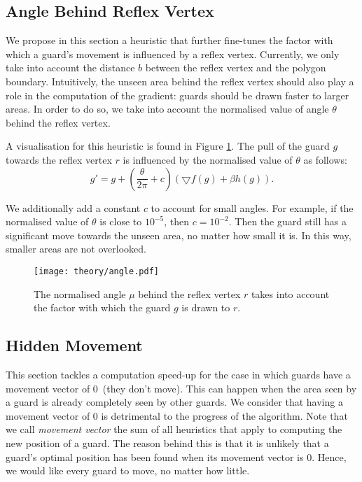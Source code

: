 \subsection{Angle Behind Reflex Vertex}
\label{sec:angle}
We propose in this section a heuristic that further fine-tunes the factor with which a guard's movement is influenced by a reflex vertex. Currently, we only take into account the distance $b$ between the reflex vertex and the polygon boundary. Intuitively, the unseen area behind the reflex vertex should also play a role in the computation of the gradient: guards should be drawn faster to larger areas. In order to do so, we  take into account the normalised value of angle $\theta$ behind the reflex vertex.

A visualisation for this heuristic is found in Figure \ref{fig:angle}. The pull of the guard $g$ towards the reflex vertex $r$ is influenced by the normalised value of $\theta$ as follows: $$g' = g + (\frac{\theta}{2\pi} + c)(\bigtriangledown f(g) + \beta h(g)).$$

We  additionally add a constant $c$ to account for small angles. For example, if the normalised value of $\theta$ is close to $10^{-5}$, then $c = 10^{-2}$. Then the guard still has a significant move towards the unseen area, no matter how small it is. In this way, smaller areas are not overlooked.

\begin{figure}[h!]
    \centering
    \texttt{[image: theory/angle.pdf]}
    \caption{The normalised angle $\mu$ behind the reflex vertex $r$ takes into account the factor with which the guard $g$ is drawn to $r$.}
    \label{fig:angle}
\end{figure}

\subsection{Hidden Movement}
\label{sec:hidden_gradient}
This section tackles a computation speed-up for the case in which guards have a movement vector of 0~(they don't move). This can happen when the area seen by a guard is already completely seen by other guards. We consider that having a movement vector of 0 is detrimental to the progress of the algorithm. Note that we call \textit{movement vector} the sum of all heuristics that apply to computing the new position of a guard. The reason behind this is that it is unlikely that a guard's optimal position has been found when its movement vector is 0. Hence, we would like every guard to move, no matter how little.

